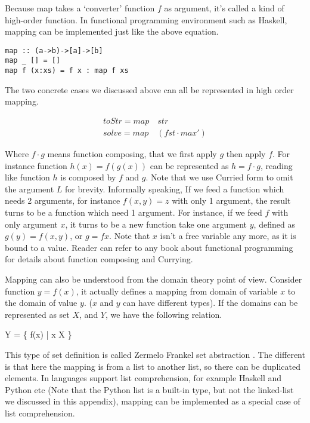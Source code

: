 \documentclass{article}
\begin{document}
Because map takes a `converter' function $f$ as argument, it's called a kind of high-order function. In functional
programming environment such as Haskell, mapping can be implemented just like the above equation.

\lstset{language=Haskell}
\begin{lstlisting}
map :: (a->b)->[a]->[b]
map _ [] = []
map f (x:xs) = f x : map f xs
\end{lstlisting}

The two concrete cases we discussed above can all be represented in high order mapping.

\[
\begin{array}{l}
toStr  = map \quad str \\
solve = map \quad (fst \cdot max')
\end{array}
\]

Where $f \cdot g$ means function composing, that we first apply $g$ then apply $f$. For instance
function $h(x) = f(g(x))$ can be represented as $h = f \cdot g $, reading like function $h$ is 
composed by $f$ and $g$. Note that we use Curried form to omit the argument $L$ for brevity. 
Informally speaking, If we feed a function which needs 2 arguments, for instance $f(x, y) = z$
with only 1 argument, the result turns to be a function which need 1 argument. For instance,
if we feed $f$ with only argument $x$, it turns to be a new function take one argument $y$, 
defined as $g(y) = f(x, y)$, or $g = f x$. Note that $x$ isn't a free variable any more, 
as it is bound to a value. Reader can refer to any book about functional programming
for details about function composing and Currying.

Mapping can also be understood from the domain theory point of view. Consider function $y = f(x)$,
it actually defines a mapping from domain of variable $x$ to the domain of value $y$. ($x$
and $y$ can have different types). If the domains can be represented as set $X$, and $Y$, we have
the following relation.

\be
Y = \{ f(x) | x \in X \}
\ee

This type of set definition is called Zermelo Frankel set abstraction \cite{algo-fp}. The different
is that here the mapping is from a list to another list, so there can be duplicated elements.
In languages support list comprehension, for example Haskell and Python etc (Note that the 
Python list is a built-in type, but not the linked-list we discussed in this appendix), mapping
can be implemented as a special case of list comprehension.
\end{document}
